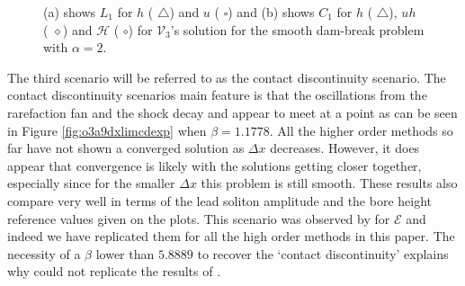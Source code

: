 \documentclass[SingleSpace,12pt,Proceedings]{Serre_ASCE}
\begin{document}
\begin{figure}
	\centering
	\caption{(a) shows $L_1$ for $h$ ({\color{red} $\triangle$}) and $u$ ({\color{blue} $\square$}) and (b) shows $C_1$ for $h$ ({\color{red} $\triangle$}), $uh$ ({\color{black} $\diamond$}) and $\mathcal{H}$ ({\color{blue} $\circ$}) for $\mathcal{V}_3$'s solution for the smooth dam-break problem with $\alpha = 2$.}
	\label{fig:o3a2dxlimmeasure}
\end{figure}

The third scenario will be referred to as the contact discontinuity \cite{El-etal-2006} scenario. The contact discontinuity scenarios main feature is that the oscillations from the rarefaction fan and the shock decay and appear to meet at a point as can be seen in Figure \ref{fig:o3a9dxlimcdexp} when $\beta = 1.1778$. All the higher order methods so far have not shown a converged solution as $\Delta x$ decreases. However, it does appear that convergence is likely with the solutions getting closer together, especially since for the smaller $\Delta x$ this problem is still smooth. These results also compare very well in terms of the lead soliton amplitude and the bore height reference values given on the plots. This scenario was observed by  for $\mathcal{E}$ and indeed we have replicated them for all the high order methods in this paper. The necessity of a $\beta$ lower than $5.8889$ to recover the `contact discontinuity' explains why \cite{Mitsotakis-etal-2014} could not replicate the results of \cite{El-etal-2006}. 
\end{document}
